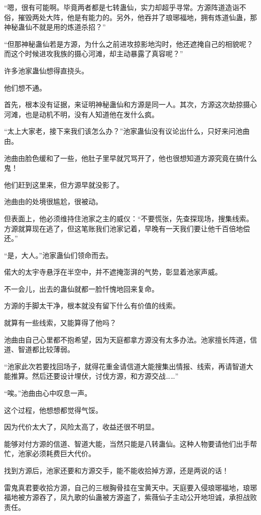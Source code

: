 \begin{this_body}
“嗯，很有可能啊。毕竟两者都是七转蛊仙，实力却超乎寻常。方源阵道造诣不俗，摧毁两处大阵，他是有能力的。另外，他吞并了琅琊福地，拥有炼道仙蛊，那神秘蛊仙不就是用的炼道杀招？”

“但那神秘蛊仙若是方源，为什么之前进攻掠影地沟时，他还遮掩自己的相貌呢？而这个时候进攻我族的摄心河滩，却主动暴露了真容呢？”

许多池家蛊仙想得直挠头。

他们想不通。

首先，根本没有证据，来证明神秘蛊仙和方源是同一人。其次，方源这次劫掠摄心河滩，也是动机不明，没有人知道他在发什么疯。

“太上大家老，接下来我们该怎么办？”池家蛊仙没有议论出什么，只好来问池曲由。

池曲由脸色缓和了一些，他肚子里早就咒骂开了，他也很想知道方源究竟在搞什么鬼！

他们赶到这里来，但方源早就没影了。

池曲由的处境很尴尬，很被动。

但表面上，他必须维持住池家之主的威仪：“不要慌张，先查探现场，搜集线索。方源就算现在逃了，但这笔账我们池家记着，早晚有一天我们要让他千百倍地偿还。”

“是，大人。”池家蛊仙们领命而去。

偌大的太宇寺悬浮在半空中，并不遮掩澎湃的气势，彰显着池家声威。

不一会儿，出去的蛊仙就都一脸忏愧地回来复命。

方源的手脚太干净，根本就没有留下什么有价值的线索。

就算有一些线索，又能算得了他吗？

池曲由自己心里都不抱希望，因为天庭都拿方源没有太多办法。池家擅长阵道，信道、智道都比较薄弱。

“池家此次若要找回场子，就得花重金请信道大能搜集出情报、线索，再请智道大能推算。然后还要设计埋伏，讨伐方源，和方源交战……”

“唉。”池曲由心中叹息一声。

这个过程，他想想都觉得气馁。

因为代价太大了，风险太高了，收益还很不明显。

能够对付方源的信道、智道大能，当然只能是八转蛊仙。这种人物要请他们出手帮忙，池家必须耗费巨大代价。

找到方源后，池家还要和方源交手，能不能收拾掉方源，还是两说的话！

雷鬼真君要收拾方源，自己的三根胸骨挂在宝黄天中。天庭要入侵琅琊福地，琅琊福地被方源吞了，凤九歌的仙蛊被方源盗了，紫薇仙子主动公开地坦诚，承担战败责任。


\end{this_body}
